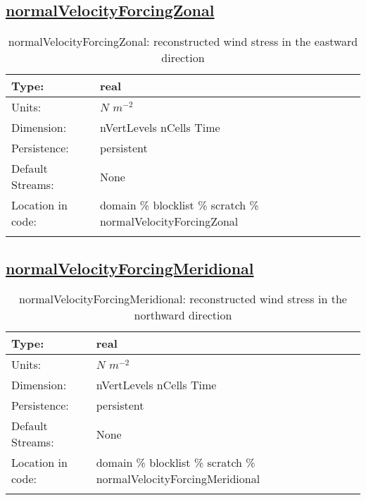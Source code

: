 \subsection[normalVelocityForcingZonal]{\hyperref[sec:var_tab_scratch]{normalVelocityForcingZonal}}
\label{subsec:var_sec_scratch_normalVelocityForcingZonal}
\begin{center}
\begin{longtable}{| p{2.0in} | p{4.0in} |}
        \hline 
        Type: & real \\
        \hline 
        Units: & $N$ $m^{-2}$ \\
        \hline 
        Dimension: & nVertLevels nCells Time \\
        \hline 
        Persistence: & persistent \\
        \hline 
		 Default Streams: & None \\
        \hline 
		 Location in code: & domain \% blocklist \% scratch \% normalVelocityForcingZonal \\
		 \hline 
    \caption{normalVelocityForcingZonal: reconstructed wind stress in the eastward direction}
\end{longtable}
\end{center}
\subsection[normalVelocityForcingMeridional]{\hyperref[sec:var_tab_scratch]{normalVelocityForcingMeridional}}
\label{subsec:var_sec_scratch_normalVelocityForcingMeridional}
\begin{center}
\begin{longtable}{| p{2.0in} | p{4.0in} |}
        \hline 
        Type: & real \\
        \hline 
        Units: & $N$ $m^{-2}$ \\
        \hline 
        Dimension: & nVertLevels nCells Time \\
        \hline 
        Persistence: & persistent \\
        \hline 
		 Default Streams: & None \\
        \hline 
		 Location in code: & domain \% blocklist \% scratch \% normalVelocityForcingMeridional \\
		 \hline 
    \caption{normalVelocityForcingMeridional: reconstructed wind stress in the northward direction}
\end{longtable}
\end{center}
